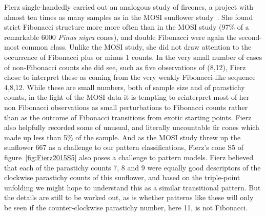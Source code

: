    



Fierz single-handedly carried out an analogous study of fircones, a  project with almost ten times as many samples as in the MOSI sunflower study~\autocite{fierzAberrantPhyllotacticPatterns2015}. She found strict Fibonacci structure more more often than in the MOSI study (97\% of a remarkable 6000 \textit{Pinus nigra} cones), and double Fibonacci were again the second-most common class. Unlike the MOSI study, she did not draw attention to the occurrence of Fibonacci plus or minus 1 counts. In the very small number of cases of non-Fibonacci counts she did see, such as five  observations of (8,12),  Fierz chose to interpret these as coming from the very weakly Fibonacci-like sequence 4,8,12. While these are small numbers, both of sample size and of parastichy counts, in the light of the MOSI data  it is tempting to reinterpret most of her non Fibonacci observations as small perturbations to Fibonacci counts rather than as the outcome of Fibonacci transitions from exotic starting points. Fierz also helpfully recorded some of unusual, and literally uncountable fir cones which made up less than 5\% of the sample.  And as the MOSI study threw up the sunflower 667 as a challenge to our pattern classifications, 
Fierz's cone S5 of figure~\ref{fig:Fierz2015S5} also poses a challenge to pattern models. Fierz believed that each of the parastichy counts 7, 8 and 9 were equally good descriptors of the clockwise parastichy counts of this sunflower, and based on the triple-point unfolding we might hope to understand this as a similar transitional pattern. But the details are still to be worked out, as is whether patterns like these will only be seen if the counter-clockwise parastichy number, here 11, is not Fibonacci.

